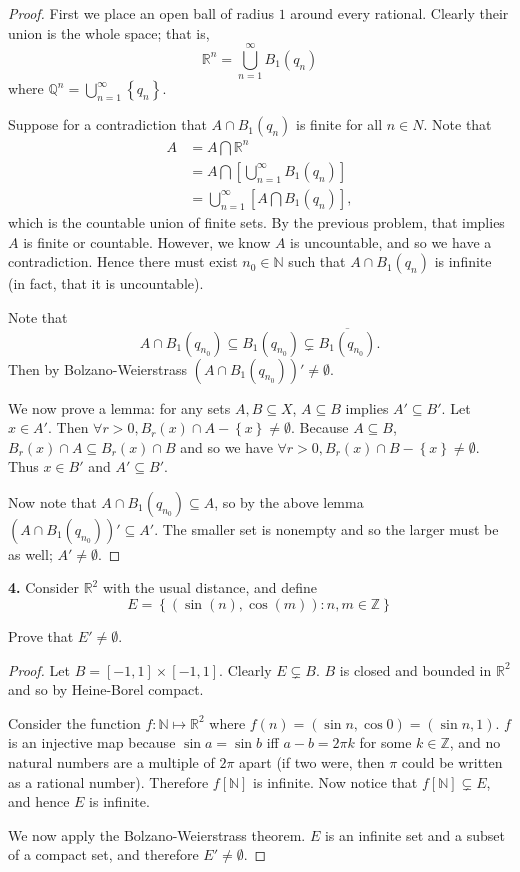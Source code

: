 \documentclass{article}
\newcommand{\R}{\mathbb{R}}
\newcommand{\Z}{\mathbb{Z}}
\newcommand{\N}{\mathbb{N}}
\newcommand{\Q}{\mathbb{Q}}
\newcommand{\set}[1]{\left\{ #1 \right\}}
\newcommand{\brac}[1]{\left[ #1 \right]}
\newcommand{\paren}[1]{\left( #1 \right)}
\newcommand{\ol}[1]{\overline{#1}}
\begin{document}
\begin{proof}

    First we place an open ball of radius $1$ around every rational. Clearly their union is the whole space; that is,
    $$\R^n = \bigcup_{n = 1}^\infty B_1(q_n)$$
    where $\Q^n = \bigcup_{n = 1}^\infty \set{q_n}$.

    Suppose for a contradiction that $A \cap B_1(q_n)$ is finite for all $n \in N$. Note that 
    \begin{align*}
        A &= A \bigcap \R^n \\
        &= A \bigcap \brac{\bigcup_{n = 1}^\infty B_1(q_n)} \\
        &= \bigcup_{n = 1}^\infty \brac{A \bigcap B_1(q_n)},
    \end{align*}
    which is the countable union of finite sets. By the previous problem, that implies $A$ is finite or countable. However, we know $A$ is uncountable, and so we have a contradiction. Hence there must exist $n_0 \in \N$ such that $A \cap B_1(q_n)$ is infinite (in fact, that it is uncountable).

    Note that
    $$A \cap B_1(q_{n_0}) \subseteq B_1(q_{n_0}) \subsetneq \ol{B_1(q_{n_0})}.$$
    Then by Bolzano-Weierstrass $(A \cap B_1(q_{n_0}))' \ne \emptyset$.

    We now prove a lemma: for any sets $A, B \subseteq X$, $A \subseteq B$ implies $A' \subseteq B'$. Let $x \in A'$. Then $\forall r > 0, B_r(x) \cap A - \set{x} \ne \emptyset$. Because $A \subseteq B$, $B_r(x) \cap A \subseteq B_r(x) \cap B$ and so we have $\forall r > 0, B_r(x) \cap B - \set{x} \ne \emptyset$. Thus $x \in B'$ and $A' \subseteq B'$.

    Now note that $A \cap B_1(q_{n_0}) \subseteq A$, so by the above lemma $(A \cap B_1(q_{n_0}))' \subseteq A'$. The smaller set is nonempty and so the larger must be as well; $A' \ne \emptyset$.
\end{proof}


\newpage %


\textbf{4. } %
Consider $\R^2$ with the usual distance, and define
$$E = \set{\paren{\sin(n), \cos(m)} : n, m \in \Z}$$

Prove that $E' \ne \emptyset$.

\begin{proof}
    Let $B = [-1, 1] \times [-1, 1]$. Clearly $E \subsetneq B$. $B$ is closed and bounded in $\R^2$ and so by Heine-Borel compact.

    Consider the function $f : \N \mapsto \R^2$ where $f(n) = \paren{\sin n, \cos 0} = \paren{\sin n, 1}$. $f$ is an injective map because $\sin a = \sin b$ iff $a - b = 2 \pi k$ for some $k \in \Z$, and no natural numbers are a multiple of $2\pi$ apart (if two were, then $\pi$ could be written as a rational number). Therefore $f[\N]$ is infinite. Now notice that $f[\N] \subsetneq E$, and hence $E$ is infinite.

    We now apply the Bolzano-Weierstrass theorem. $E$ is an infinite set and a subset of a compact set, and therefore $E' \ne \emptyset$.    
\end{proof}
\end{document}
